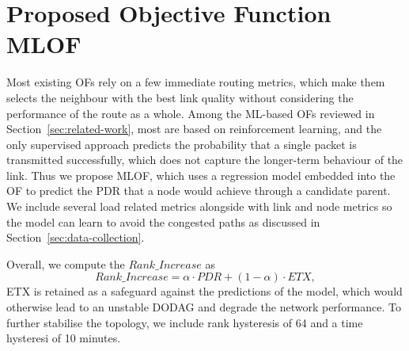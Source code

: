 \section{Proposed Objective Function MLOF}
Most existing OFs rely on a few immediate routing metrics, which make them
selects the neighbour with the best link
quality without considering the performance of the route as a whole.
Among the ML-based OFs reviewed in Section~\ref{sec:related-work},
most are based on reinforcement learning, and the only supervised
approach predicts the probability that a single packet is
transmitted successfully, which does not capture the longer-term
behaviour of the link. Thus we propose MLOF, which uses a regression
model embedded into the OF to predict the PDR that a node would
achieve through a candidate parent. We include several load related
metrics alongside with link and node metrics so the model can learn
to avoid the congested paths as discussed in Section~\ref{sec:data-collection}.

Overall, we compute the $\mathit{Rank\_Increase}$ as
\begin{equation}
    \mathit{Rank\_Increase} = \alpha \cdot PDR
    + (1 - \alpha) \cdot \mathit{ETX},
\end{equation}
ETX is retained as a safeguard against the predictions of
the model, which would otherwise lead to an unstable DODAG and degrade
the network performance. To further stabilise the topology, we
include rank hysteresis of 64 and a time hysteresi of 10 minutes.

